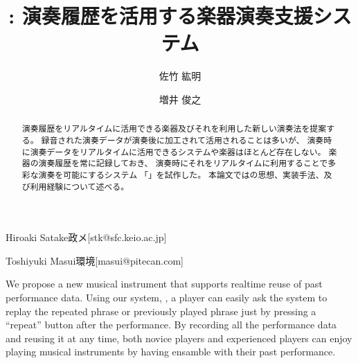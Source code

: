 \documentclass[submit,techreq]{ec2017}
\begin{document}
\title{{\system}: 演奏履歴を活用する楽器演奏支援システム}



\author{佐竹 紘明}{Hiroaki Satake}{政メ}[stk@sfc.keio.ac.jp]
\author{増井 俊之}{Toshiyuki Masui}{環境}[masui@pitecan.com]

\begin{abstract} %

演奏履歴をリアルタイムに活用できる楽器及びそれを利用した新しい演奏法を提案する。
%
録音された演奏データが演奏後に加工されて活用されることは多いが、
演奏時に演奏データをリアルタイムに活用できるシステムや楽器はほとんど存在しない。
%
 楽器の演奏履歴を常に記録しておき、
演奏時にそれをリアルタイムに利用することで多彩な演奏を可能にするシステム
「{\system}」を試作した。
%
本論文では{\system}の思想、実装手法、及び利用経験について述べる。

\end{abstract}


\begin{eabstract}

We propose a new musical instrument that supports realtime reuse of
past performance data.
%
Using our system, \textit{\system},
a player can easily ask the system to replay the repeated phrase or
previously played phrase just by pressing a ``repeat'' button after the performance.
%
By recording all the performance data and reusing it at any time,
both novice players and experienced players can enjoy playing musical instruments
by having ensamble with their past performance.

\end{eabstract}


\maketitle










\end{document}
